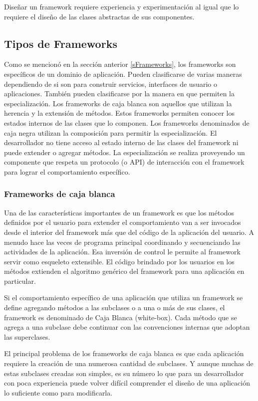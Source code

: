 Diseñar un framework requiere experiencia y experimentación al igual que lo requiere el diseño de las clases abstractas de sus componentes.\cite{johnson1988designing} 


\subsection{Tipos de Frameworks}

	Como se mencionó en la sección anterior \ref{sFrameworks}, los frameworks son específicos de un dominio de aplicación. Pueden clasificarse de varias maneras dependiendo de si son para construir servicios, interfaces de usuario o aplicaciones. También pueden clasificarse por la manera en que permiten la especialización. Los frameworks de caja blanca son aquellos que utilizan la herencia y la extensión de métodos. Estos frameworks permiten conocer los estados internos de las clases que lo componen. Los frameworks denominados de caja negra utilizan la composición para permitir la especialización. El desarrollador no tiene acceso al estado interno de las clases del framework ni puede extender o agregar métodos. La especialización se realiza proveyendo un componente que respeta un protocolo (o API) de interacción con el framework para lograr el comportamiento específico.   

\subsubsection{Frameworks de caja blanca}

	Una de las características importantes de un framework es que los métodos definidos por el usuario para extender el comportamiento van a ser invocados desde el interior del framework más que del código de la aplicación del usuario. A menudo hace las veces de programa principal coordinando y secuenciando las actividades de la aplicación. Esa inversión de control le permite al framework servir como esqueleto extensible. El código brindado por los usuarios en los métodos extienden el algoritmo genérico del framework para una aplicación en particular. 
	
	Si el comportamiento específico de una aplicación que utiliza un framework se define agregando métodos a las subclases o a una o más de sus clases, el framework es denominado de Caja Blanca (white-box). Cada método que se agrega a una subclase debe continuar con las convenciones internas que adoptan las superclases. 
	
	El principal problema de los frameworks de caja blanca es que cada aplicación requiere la creación de una numerosa cantidad  de subclases. Y aunque muchas de estas subclases creadas son simples, es su número lo que para un desarrollador con poca experiencia puede volver difícil comprender el diseño de una aplicación lo suficiente como para modificarla.
	
